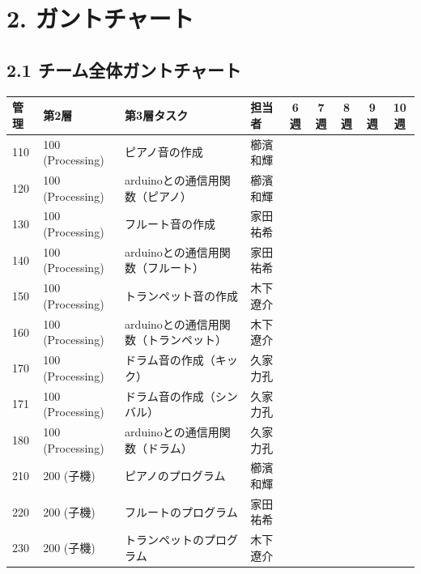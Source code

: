 \documentclass[a4paper,11pt]{ltjsarticle}
\providecommand{\％}{\%}
\begin{document}
\section{2. ガントチャート}

\subsection*{2.1 チーム全体ガントチャート}

\renewcommand{\arraystretch}{1.3}

\begin{longtable}{|p{0.9cm}|p{2.0cm}|p{4.4cm}|p{1.5cm}|c|c|c|c|c|}
\hline
\rowcolor[gray]{0.9}
管理 & 第2層 & 第3層タスク & 担当者 & 6週 & 7週 & 8週 & 9週 & 10週 \\
\hline
110 & 100 (Processing) & ピアノ音の作成 & 櫛濱和輝 & \cellcolor{ganttCell} & & & & \\
\hline
120 & 100 (Processing) & arduinoとの通信用関数（ピアノ） & 櫛濱和輝 & & & \cellcolor{ganttCell} & \cellcolor{ganttCell} & \\
\hline
130 & 100 (Processing) & フルート音の作成 & 家田祐希 & \cellcolor{ganttCell} & & & & \\
\hline
140 & 100 (Processing) & arduinoとの通信用関数（フルート） & 家田祐希 & & & \cellcolor{ganttCell} & \cellcolor{ganttCell} & \\
\hline
150 & 100 (Processing) & トランペット音の作成 & 木下遼介 & \cellcolor{ganttCell} & & & & \\
\hline
160 & 100 (Processing) & arduinoとの通信用関数（トランペット） & 木下遼介 & & & \cellcolor{ganttCell} & \cellcolor{ganttCell} & \\
\hline
170 & 100 (Processing) & ドラム音の作成（キック） & 久家力孔 & \cellcolor{ganttCell} & & & & \\
\hline
171 & 100 (Processing) & ドラム音の作成（シンバル） & 久家力孔 & \cellcolor{ganttCell} & & & & \\
\hline
180 & 100 (Processing) & arduinoとの通信用関数（ドラム） & 久家力孔 & & & \cellcolor{ganttCell} & \cellcolor{ganttCell} & \\
\hline
210 & 200 (子機) & ピアノのプログラム & 櫛濱和輝 & & \cellcolor{ganttCell} & & & \\
\hline
220 & 200 (子機) & フルートのプログラム & 家田祐希 & & \cellcolor{ganttCell} & & & \\
\hline
230 & 200 (子機) & トランペットのプログラム & 木下遼介 & & \cellcolor{ganttCell} & & & \\

\end{longtable}
\end{document}
